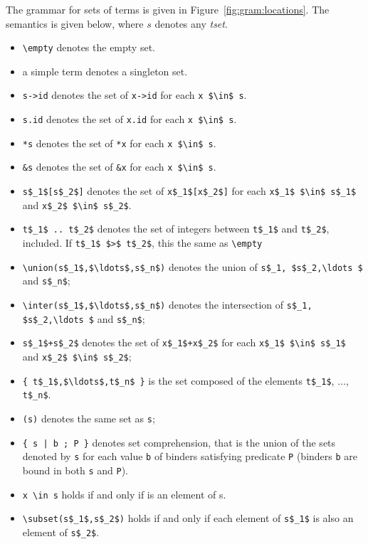 The grammar for sets of terms is given in
Figure~\ref{fig:gram:locations}. The semantics is given below,
where $s$ denotes any \textsl{tset}.
\begin{itemize}
\item \lstinline|\empty| denotes the empty set.
\item a simple term denotes a singleton set.
\item \lstinline|s->id| denotes the set of \lstinline|x->id| for each
  \lstinline|x $\in$ s|.
\item \lstinline|s.id| denotes the set of \lstinline|x.id| for each
  \lstinline|x $\in$ s|.
\item \lstinline|*s| denotes the set of \lstinline|*x| for each
  \lstinline|x $\in$ s|.
\item \lstinline|&s| denotes the set of \lstinline|&x| for each
  \lstinline|x $\in$ s|.
\item \lstinline|s$_1$[s$_2$]| denotes the set of
\lstinline|x$_1$[x$_2$]| for each \lstinline|x$_1$ $\in$ s$_1$|
  and \lstinline|x$_2$ $\in$ s$_2$|.
\item \lstinline|t$_1$ .. t$_2$| denotes the set of integers between 
\lstinline|t$_1$| and \lstinline|t$_2$|, included. 
If \lstinline|t$_1$ $>$ t$_2$|, this the same as \lstinline+\empty+
\item \lstinline|\union(s$_1$,$\ldots$,s$_n$)|
denotes the union 
of \lstinline|s$_1, $s$_2,\ldots $| and \lstinline|s$_n$|;
\item \lstinline|\inter(s$_1$,$\ldots$,s$_n$)|
denotes the intersection 
of \lstinline|s$_1, $s$_2,\ldots $| and \lstinline|s$_n$|;
\item \lstinline|s$_1$+s$_2$| denotes the set of
  \lstinline|x$_1$+x$_2$| for each \lstinline|x$_1$ $\in$ s$_1$|
  and \lstinline|x$_2$ $\in$ s$_2$|;
\item \lstinline|{ t$_1$,$\ldots$,t$_n$ }| is the set composed of the
elements \lstinline|t$_1$|, $\ldots$, \lstinline|t$_n$|.
\item \lstinline|(s)| denotes the same set as \lstinline|s|;
\item \lstinline+{ s | b ; P }+ denotes set
  comprehension,
  that is the union of the sets denoted by \lstinline|s| for each
  value \lstinline|b| of binders
  satisfying predicate \lstinline|P|
  (binders \lstinline|b| are bound in both \lstinline|s| and \lstinline|P|).
\item \lstinline|x \in s| holds if and only if is an element of s.
\item \lstinline|\subset(s$_1$,s$_2$)| holds if and only if each element
  of \lstinline|s$_1$| is also an element of \lstinline|s$_2$|.
\end{itemize}

